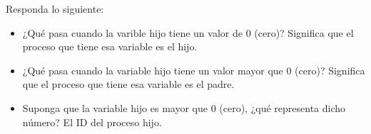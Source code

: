 	Responda lo siguiente:

	\begin{itemize}

		\item ¿Qué pasa cuando la varible hijo tiene un valor de 0 (cero)? Significa que el proceso que tiene esa variable es el hijo.
		\item ¿Qué pasa cuando la variable hijo tiene un valor mayor que 0 (cero)? Significa que el proceso que tiene esa variable es el padre.
		\item Suponga que la variable hijo es mayor que 0 (cero), ¿qué representa dicho número? El ID del proceso hijo.

	\end{itemize}
	